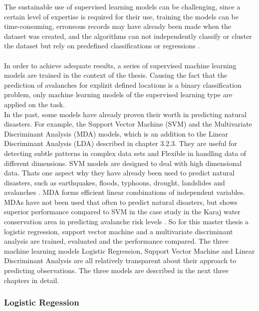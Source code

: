 \documentclass[../masterarbeit.tex]{subfiles}
\begin{document}
The sustainable use of supervised learning models can be challenging, since a certain level of expertise is required for their use, training the models can be time-consuming, erroneous records may have already been made when the dataset was created, and the algorithms can not independently classify or cluster the dataset but rely on predefined classifications or regressions \textcite[]{ibm-supervised-learning:2022}. \\~\\
In order to achieve adequate results, a series of supervised machine learning models are trained in the context of the thesis. Causing the fact that the prediction of avalanches for explizit defined locations is a binary classification problem, only machine learning models of the supervised learning type are applied on the task.\\
In the past, some models have already proven their worth in predicting natural disasters. For example, the Support Vector Machine (SVM) and the Multivariate Discriminant Analysis (MDA) models, which is an addition to the Linear Discriminant Analysis (LDA) described in chapter 3.2.3. They are useful for detecting subtle patterns in complex data sets and Flexible in handling data of different dimensions. SVM models are designed to deal with high dimensional data. Thats one aspect why they have already been used to predict natural disasters, such as earthquakes, floods, typhoons, drought, landslides and avalanches \textcite[]{Bahram:2019} \textcite[]{Tiwari:2021} \textcite[]{Pozdnoukhov:2008}. MDA forms efficient linear combinations of independent variables. MDAs have not been used that often to predict natural disasters, but shows superior performance compared to SVM in the case study in the Karaj water conservation area in predicting avalanche risk levels \textcite[]{Bahram:2019}. So for this master thesis a logistic regression, support vector machine and a multivariate discriminant analysis are trained, evaluated and the performance compared. The three machine learning models Logistic Regression, Support Vector Machine and Linear Discriminant Analysis are all relatively transparent about their approach to predicting observations. The three models are described in the next three chapters in detail.


\subsubsection{Logistic Regession}
\end{document}
